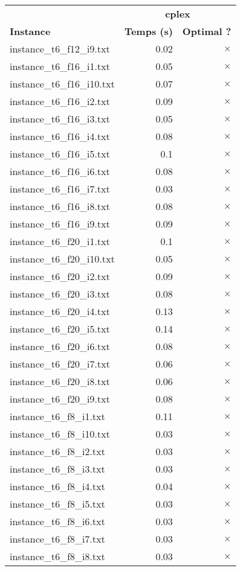 \documentclass{article}
\begin{document}
\newpage
\begin{center}
\renewcommand{\arraystretch}{1.4} 
\begin{tabular}{lrr}
	\hline
 & \multicolumn{2}{c}{\textbf{cplex}}\\
\textbf{Instance}  & \textbf{Temps (s)} & \textbf{Optimal ?} \\\hline

instance\_t6\_f12\_i9.txt & 0.02 & 
$\times$
\\
instance\_t6\_f16\_i1.txt & 0.05 & 
$\times$
\\
instance\_t6\_f16\_i10.txt & 0.07 & 
$\times$
\\
instance\_t6\_f16\_i2.txt & 0.09 & 
$\times$
\\
instance\_t6\_f16\_i3.txt & 0.05 & 
$\times$
\\
instance\_t6\_f16\_i4.txt & 0.08 & 
$\times$
\\
instance\_t6\_f16\_i5.txt & 0.1 & 
$\times$
\\
instance\_t6\_f16\_i6.txt & 0.08 & 
$\times$
\\
instance\_t6\_f16\_i7.txt & 0.03 & 
$\times$
\\
instance\_t6\_f16\_i8.txt & 0.08 & 
$\times$
\\
instance\_t6\_f16\_i9.txt & 0.09 & 
$\times$
\\
instance\_t6\_f20\_i1.txt & 0.1 & 
$\times$
\\
instance\_t6\_f20\_i10.txt & 0.05 & 
$\times$
\\
instance\_t6\_f20\_i2.txt & 0.09 & 
$\times$
\\
instance\_t6\_f20\_i3.txt & 0.08 & 
$\times$
\\
instance\_t6\_f20\_i4.txt & 0.13 & 
$\times$
\\
instance\_t6\_f20\_i5.txt & 0.14 & 
$\times$
\\
instance\_t6\_f20\_i6.txt & 0.08 & 
$\times$
\\
instance\_t6\_f20\_i7.txt & 0.06 & 
$\times$
\\
instance\_t6\_f20\_i8.txt & 0.06 & 
$\times$
\\
instance\_t6\_f20\_i9.txt & 0.08 & 
$\times$
\\
instance\_t6\_f8\_i1.txt & 0.11 & 
$\times$
\\
instance\_t6\_f8\_i10.txt & 0.03 & 
$\times$
\\
instance\_t6\_f8\_i2.txt & 0.03 & 
$\times$
\\
instance\_t6\_f8\_i3.txt & 0.03 & 
$\times$
\\
instance\_t6\_f8\_i4.txt & 0.04 & 
$\times$
\\
instance\_t6\_f8\_i5.txt & 0.03 & 
$\times$
\\
instance\_t6\_f8\_i6.txt & 0.03 & 
$\times$
\\
instance\_t6\_f8\_i7.txt & 0.03 & 
$\times$
\\
instance\_t6\_f8\_i8.txt & 0.03 & 
$\times$
\\
\hline\end{tabular}
\end{center}
\end{document}
